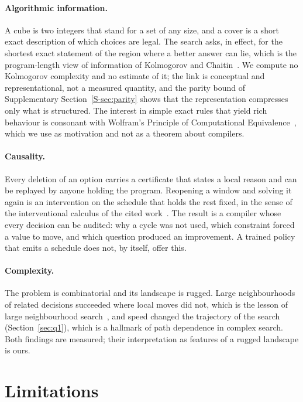 \documentclass[11pt,a4paper]{article}
\begin{document}
\paragraph{Algorithmic information.} A cube is two integers that stand for a set
of any size, and a cover is a short exact description of which choices are legal.
The search asks, in effect, for the shortest exact statement of the region where a
better answer can lie, which is the program-length view of information of
Kolmogorov and Chaitin~\cite{kolmogorov1965,chaitin1966,li2019}. We compute no
Kolmogorov complexity and no estimate of it; the link is conceptual and
representational, not a measured quantity, and the parity bound of Supplementary
Section~\ref{S-sec:parity} shows that the representation compresses only what is
structured. The interest in simple exact rules that yield rich behaviour is
consonant with Wolfram's Principle of Computational Equivalence~\cite{wolfram2002,
wolfram2002pce}, which we use as motivation and not as a theorem about compilers.

\paragraph{Causality.} Every deletion of an option carries a certificate that
states a local reason and can be replayed by anyone holding the program. Reopening
a window and solving it again is an intervention on the schedule that holds the
rest fixed, in the sense of the interventional calculus of the cited
work~\cite{zenil2019calculus}. The result is a compiler whose every decision can be
audited: why a cycle was not used, which constraint forced a value to move, and
which question produced an improvement. A trained policy that emits a schedule does
not, by itself, offer this.

\paragraph{Complexity.} The problem is combinatorial and its landscape is rugged.
Large neighbourhoods of related decisions succeeded where local moves did not,
which is the lesson of large neighbourhood search~\cite{shaw1998}, and speed
changed the trajectory of the search (Section~\ref{sec:q1}), which is a hallmark of
path dependence in complex search. Both findings are measured; their
interpretation as features of a rugged landscape is ours.

\section{Limitations}\label{sec:limits}
\end{document}
